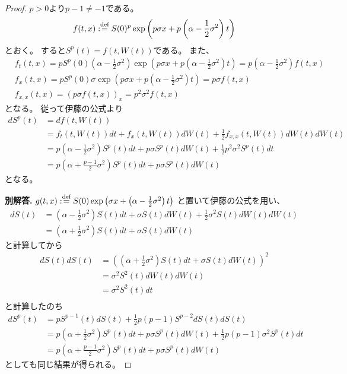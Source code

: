 \documentclass[uplatex]{jsarticle}
\theoremstyle{definition}
\def\dfn{:\overset{\mbox{{\scriptsize def}}}{=}}
\begin{document}
\begin{proof}
  \(p>0\)より\(p-1 \neq -1\)である。
  \[
  f(t,x) \dfn S(0)^p\exp\left(
  p\sigma x + p\left( \alpha - \frac{1}{2}\sigma^2\right)t\right)
  \]
  とおく。
  すると\(S^p(t) = f(t,W(t))\)である。
  また、
  \begin{align*}
    & f_t(t,x) = pS^p(0)\left( \alpha - \frac{1}{2}\sigma^2\right)
    \exp\left(p\sigma x + p\left( \alpha - \frac{1}{2}\sigma^2\right)t\right)
    = p\left( \alpha - \frac{1}{2}\sigma^2\right)f(t,x) \\
    & f_x(t,x) = pS^p(0)\sigma
    \exp\left(p\sigma x + p\left( \alpha - \frac{1}{2}\sigma^2\right)t\right)
    = p\sigma f(t,x) \\
    & f_{x,x}(t,x) = (p\sigma f(t,x))_x = p^2\sigma^2f(t,x)
  \end{align*}
  となる。
  従って伊藤の公式より
  \begin{align*}
    dS^p(t)
    &= df(t,W(t)) \\
    &= f_t(t,W(t)) dt + f_x(t,W(t)) dW(t)
    + \frac{1}{2}f_{x,x}(t,W(t)) dW(t)dW(t) \\
    &= p\left( \alpha - \frac{1}{2}\sigma^2\right)S^p(t) dt
    + p\sigma S^p(t) dW(t)
    + \frac{1}{2}p^2\sigma^2 S^p(t) dt \\
    &= p\left( \alpha + \frac{p-1}{2}\sigma^2 \right)S^p(t)dt
    + p\sigma S^p(t) dW(t)
  \end{align*}
  となる。

  \textbf{別解答.}
  \(g(t,x) \dfn S(0)\exp\left(
  \sigma x + \left( \alpha - \frac{1}{2}\sigma^2\right)t\right)\)
  と置いて伊藤の公式を用い、
  \begin{align*}
    dS(t)
    &= \left( \alpha - \frac{1}{2}\sigma^2\right)S(t)dt
    + \sigma S(t) dW(t) + \frac{1}{2}\sigma^2 S(t) dW(t)dW(t) \\
    &= \left( \alpha + \frac{1}{2}\sigma^2\right)S(t)dt
    + \sigma S(t) dW(t)
  \end{align*}
  と計算してから
  \begin{align*}
    dS(t)dS(t)
    &= \left( \left( \alpha + \frac{1}{2}\sigma^2\right)S(t)dt
    + \sigma S(t) dW(t) \right) ^2  \\
    &= \sigma^2 S^2(t) dW(t)dW(t)  \\
    &= \sigma^2 S^2(t) dt  \\
  \end{align*}
  と計算したのち
  \begin{align*}
    dS^p(t)
    &= pS^{p-1}(t)dS(t) + \frac{1}{2}p(p-1)S^{p-2}dS(t)dS(t) \\
    &= p\left( \alpha + \frac{1}{2}\sigma^2\right)S^p(t)dt
    + p\sigma S^p(t) dW(t) + \frac{1}{2}p(p-1)\sigma^2S^p(t)dt \\
    &= p\left( \alpha + \frac{p-1}{2}\sigma^2\right)S^p(t)dt
    + p\sigma S^p(t) dW(t)
  \end{align*}
  としても同じ結果が得られる。
\end{proof}
\end{document}

